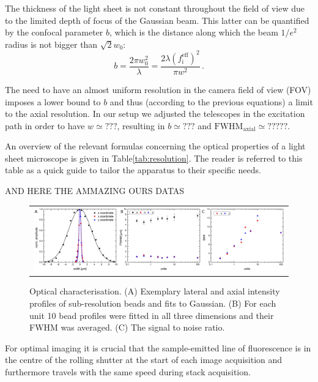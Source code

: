 \documentclass[12pt]{spieman}  %
\begin{document}
The thickness of the light sheet is not constant throughout the field of view due to the limited depth of focus of the Gaussian beam. This latter can be quantified by the confocal parameter $b$, which is the distance along which the beam $1/e^2$ radius is not bigger than $\sqrt{2} w_0$:
\begin{equation}
b = \frac{2\pi w_0^2}{\lambda} = \frac{2 \lambda  {(f_{\text{i}}^{\text{eff}})}^2}{\pi w^2}\, .
\end{equation}

The need to have an almost uniform resolution in the camera field of view (FOV) imposes a lower bound to $b$ and thus (according to the previous equations) a limit to the axial resolution. In our setup we adjusted the telescopes in the excitation path in order to have $w \simeq ???$, resulting in $b \simeq ???$ and $\text{FWHM}_{\text{axial}} \simeq?????$. 

An overview of the relevant formulas concerning the optical properties of a light sheet microscope is given in Table\ref{tab:resolution}. The reader is referred to this table as a quick guide to tailor the apparatus to their specific needs.


AND HERE THE AMMAZING OURS DATAS

	\begin{figure}
   \begin{center}
   \begin{tabular}{c}
   \includegraphics[width=\textwidth]{origin.eps}
   \end{tabular}
   \end{center}
   \caption{\label{fig:origin} Optical characterisation. (A) Exemplary lateral and axial intensity profiles of sub-resolution beads and fits to Gaussian. (B) For each unit 10 bead profiles were fitted in all three dimensions and their FWHM was averaged. (C) The signal to noise ratio.} 
   \end{figure}



For optimal imaging it is crucial that the sample-emitted line of fluorescence is in the centre of the rolling shutter at the start of each image acquisition and furthermore travels with the same speed during stack acquisition. 
\end{document}
